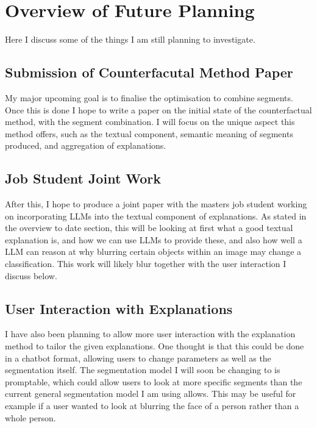 \section{Overview of Future Planning}

Here I discuss some of the things I am still planning to investigate.

\subsection{Submission of Counterfacutal Method Paper}

My major upcoming goal is to finalise the optimisation to combine segments. Once this is done I hope to write a paper on the initial state of the counterfactual method, with the segment combination. I will focus on the unique aspect this method offers, such as the textual component, semantic meaning of segments produced, and aggregation of explanations. \\

\subsection{Job Student Joint Work}

After this, I hope to produce a joint paper with the masters job student working on incorporating LLMs into the textual component of explanations. As stated in the overview to date section, this will be looking at first what a good textual explanation is, and how we can use LLMs to provide these, and also how well a LLM can reason at why blurring certain objects within an image may change a classification. This work will likely blur together with the user interaction I discuss below. \\

\subsection{User Interaction with Explanations}

I have also been planning to allow more user interaction with the explanation method to tailor the given explanations. One thought is that this could be done in a chatbot format, allowing users to change parameters as well as the segmentation itself. The segmentation model I will soon be changing to is promptable, which could allow users to look at more specific segments than the current general segmentation model I am using allows. This may be useful for example if a user wanted to look at blurring the face of a person rather than a whole person. \\

